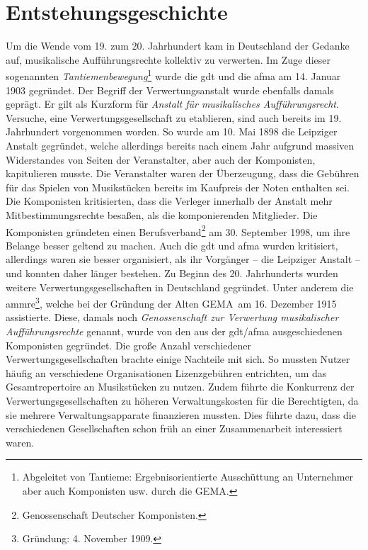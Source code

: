 \section{Entstehungsgeschichte}
\glqq Um die Wende vom 19. zum 20. Jahrhundert kam in Deutschland der Gedanke auf, musikalische Aufführungsrechte kollektiv zu verwerten.\grqq {} Im Zuge dieser sogenannten \textit{Tantiemenbewegung}\footnote{Abgeleitet von Tantieme: Ergebnisorientierte Ausschüttung an Unternehmer aber auch Komponisten usw. durch die GEMA.} wurde die \gls{gdt} und die \gls{afma} am 14. Januar 1903 gegründet. Der Begriff der Verwertungsanstalt wurde ebenfalls damals geprägt. Er gilt als Kurzform für \textit{Anstalt für musikalisches Aufführungsrecht}.
\newline
\newline
Versuche, eine Verwertungsgesellschaft zu etablieren, sind auch bereits im 19. Jahrhundert vorgenommen worden. So wurde am 10. Mai 1898 die Leipziger Anstalt gegründet, welche allerdings bereits nach einem Jahr aufgrund massiven Widerstandes von Seiten der Veranstalter, aber auch der Komponisten, kapitulieren musste. Die Veranstalter waren der Überzeugung, dass die Gebühren für das Spielen von Musikstücken bereits im Kaufpreis der Noten enthalten sei. Die Komponisten kritisierten, dass die Verleger innerhalb der Anstalt mehr Mitbestimmungsrechte besaßen, als die komponierenden Mitglieder. Die Komponisten gründeten einen Berufsverband\footnote{Genossenschaft Deutscher Komponisten.} am 30. September 1998, um ihre Belange besser geltend zu machen.
\newline
\newline
Auch die \gls{gdt} und \gls{afma} wurden kritisiert, allerdings waren sie besser organisiert, als ihr Vorgänger -- die Leipziger Anstalt -- und konnten daher länger bestehen. Zu Beginn des 20. Jahrhunderts wurden weitere Verwertungsgesellschaften in Deutschland gegründet. Unter anderem die \gls{ammre}\footnote{Gründung: 4. November 1909.}, welche bei der Gründung der \glqq Alten GEMA\grqq~am 16. Dezember 1915 assistierte. Diese, damals noch \textit{Genossenschaft zur Verwertung musikalischer Aufführungsrechte} genannt, wurde von den aus der \gls{gdt}/\gls{afma} ausgeschiedenen Komponisten gegründet.
\newline
\newline
Die große Anzahl verschiedener Verwertungsgesellschaften brachte einige Nachteile mit sich. So mussten Nutzer häufig an verschiedene Organisationen Lizenzgebühren entrichten, um das Gesamtrepertoire an Musikstücken zu nutzen. Zudem führte die Konkurrenz der Verwertungsgesellschaften zu höheren Verwaltungskosten für die Berechtigten, da sie mehrere Verwaltungsapparate finanzieren mussten. Dies führte dazu, dass die verschiedenen Gesellschaften schon früh an einer Zusammenarbeit interessiert waren.
